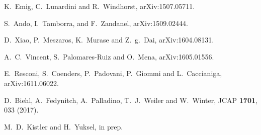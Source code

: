 \documentclass[aps,prd,nofootinbib,twocolumn,floatfix,letterpaper,superscriptaddress,showpacs]{revtex4}
\begin{document}
\begin{thebibliography}{99}
  K.~Emig, C.~Lunardini and R.~Windhorst,
  arXiv:1507.05711.

  S.\ Ando, I.\ Tamborra, and F.\ Zandanel,
  arXiv:1509.02444.


  D.~Xiao, P.~Meszaros, K.~Murase and Z.~g.~Dai,
  arXiv:1604.08131.

  A.~C.~Vincent, S.~Palomares-Ruiz and O.~Mena,
  arXiv:1605.01556.

  E.~Resconi, S.~Coenders, P.~Padovani, P.~Giommi and L.~Caccianiga,
  arXiv:1611.06022.

  D.~Biehl, A.~Fedynitch, A.~Palladino, T.~J.~Weiler and W.~Winter,
  JCAP {\bf 1701}, 033 (2017).


  M.~D.\ Kistler and H.\ Yuksel,
  in prep.


\end{thebibliography}
\end{document}
